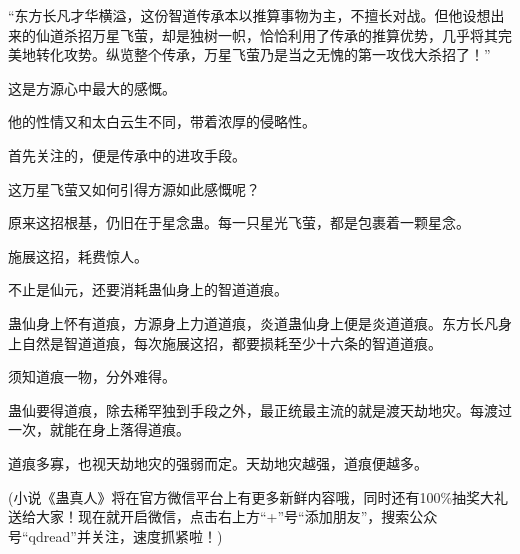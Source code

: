 \begin{this_body}
“东方长凡才华横溢，这份智道传承本以推算事物为主，不擅长对战。但他设想出来的仙道杀招万星飞萤，却是独树一帜，恰恰利用了传承的推算优势，几乎将其完美地转化攻势。纵览整个传承，万星飞萤乃是当之无愧的第一攻伐大杀招了！”

这是方源心中最大的感慨。

他的性情又和太白云生不同，带着浓厚的侵略性。

首先关注的，便是传承中的进攻手段。

这万星飞萤又如何引得方源如此感慨呢？

原来这招根基，仍旧在于星念蛊。每一只星光飞萤，都是包裹着一颗星念。

施展这招，耗费惊人。

不止是仙元，还要消耗蛊仙身上的智道道痕。

蛊仙身上怀有道痕，方源身上力道道痕，炎道蛊仙身上便是炎道道痕。东方长凡身上自然是智道道痕，每次施展这招，都要损耗至少十六条的智道道痕。

须知道痕一物，分外难得。

蛊仙要得道痕，除去稀罕独到手段之外，最正统最主流的就是渡天劫地灾。每渡过一次，就能在身上落得道痕。

道痕多寡，也视天劫地灾的强弱而定。天劫地灾越强，道痕便越多。

(小说《蛊真人》将在官方微信平台上有更多新鲜内容哦，同时还有100\%抽奖大礼送给大家！现在就开启微信，点击右上方“+”号“添加朋友”，搜索公众号“qdread”并关注，速度抓紧啦！)

\end{this_body}

